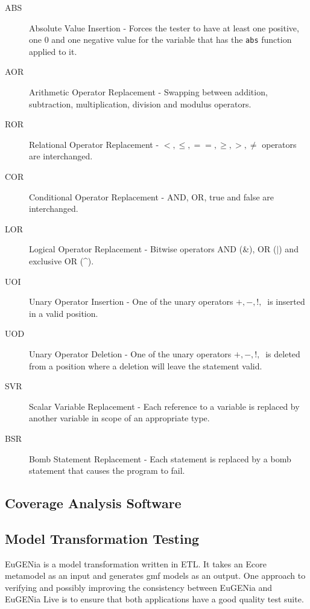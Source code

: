 \begin{description}
\item[ABS] Absolute Value Insertion - Forces the tester to have at least one positive, one 0 and one negative value for the variable that has the \verb+abs+ function applied to it.
\item[AOR] Arithmetic Operator Replacement - Swapping between addition, subtraction, multiplication, division and modulus operators.
\item[ROR] Relational Operator Replacement - $<, \leq, ==, \geq, >, \neq$ operators are interchanged.
\item[COR] Conditional Operator Replacement - AND, OR, true and false are interchanged.
\item[LOR] Logical Operator Replacement - Bitwise operators AND (\&), OR ($\mid$) and exclusive OR (\^{}).
\item[UOI] Unary Operator Insertion - One of the unary operators $+, -, !, ~ $ is inserted in a valid position.
\item[UOD] Unary Operator Deletion - One of the unary operators $+, -, !, ~ $ is deleted from a position where a deletion will leave the statement valid.
\item[SVR] Scalar Variable Replacement - Each reference to a variable is replaced by another variable in scope of an appropriate type.
\item[BSR] Bomb Statement Replacement - Each statement is replaced by a bomb statement that causes the program to fail.
\end{description}

\citet{softwareTestingIntro} 
\subsection{Coverage Analysis Software}

\subsection{Model Transformation Testing}

EuGENia is a model transformation written in ETL. It takes an Ecore metamodel as an input and generates gmf models as an output\citep{eugeniaSite}. One approach to verifying and possibly improving the consistency between EuGENia and EuGENia Live is to ensure that both applications have a good quality test suite.

